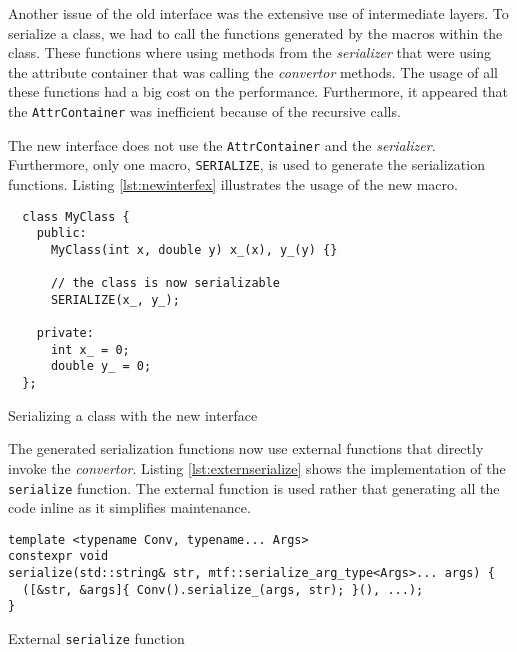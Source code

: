 Another issue of the old interface was the extensive use of intermediate layers.
To serialize a class, we had to call the functions generated by the macros
within the class. These functions where using methods from the
\textit{serializer} that were using the attribute container that was calling the
\textit{convertor} methods. The usage of all these functions had a big cost on
the performance. Furthermore, it appeared that the \texttt{AttrContainer} was
inefficient because of the recursive calls.

The new interface does not use the \texttt{AttrContainer} and the
\textit{serializer}. Furthermore, only one macro, \texttt{SERIALIZE}, is used to
generate the serialization functions. Listing \ref{lst:newinterfex} illustrates
the usage of the new macro.

\begin{listing}[ht!]
\begin{verbatim}
  class MyClass {
    public:
      MyClass(int x, double y) x_(x), y_(y) {}

      // the class is now serializable
      SERIALIZE(x_, y_);

    private:
      int x_ = 0;
      double y_ = 0;
  };
\end{verbatim}
\caption{Serializing a class with the new interface}
\label{lst:newinterfex}
\end{listing}

The generated serialization functions now use external functions that directly
invoke the \textit{convertor}. Listing \ref{lst:externserialize} shows the
implementation of the \texttt{serialize} function. The external function is used
rather that generating all the code inline as it simplifies maintenance.

\clearpage{}
\begin{listing}[ht!]
\begin{verbatim}
template <typename Conv, typename... Args>
constexpr void
serialize(std::string& str, mtf::serialize_arg_type<Args>... args) {
  ([&str, &args]{ Conv().serialize_(args, str); }(), ...);
}
\end{verbatim}
\caption{External \texttt{serialize} function}
\label{lst:externserialize}
\end{listing}

